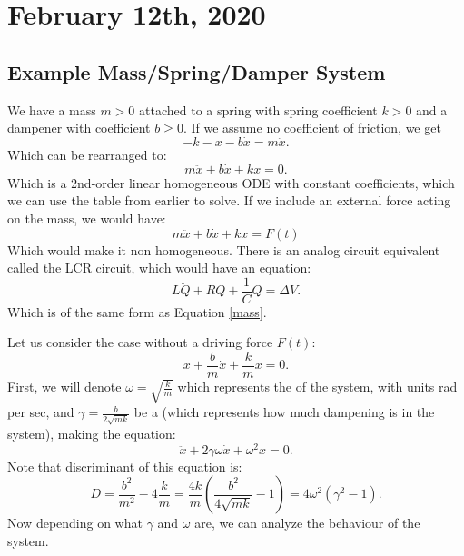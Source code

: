 \documentclass[../main/main.tex]{subfiles}
\begin{document}
\section{February 12th, 2020}
\subsection{Example Mass/Spring/Damper System}
We have a mass $m>0$ attached to a spring with spring coefficient $k>0$ and a dampener with coefficient $b\ge 0$. If we assume no coefficient of friction, we get \[
	-k-x-b\dot{x} = m\ddot{x}
.\] Which can be rearranged to: \[
m\ddot{x} + b\dot{x}+kx=0
.\] Which is a 2nd-order linear homogeneous ODE with constant coefficients, which we can use the table from earlier to solve. If we include an external force acting on the mass, we would have:
\begin{equation} \label{mass}
m\ddot{x}+b\dot{x}+kx=F(t) 
\end{equation}
Which would make it non homogeneous. There is an analog circuit equivalent called the LCR circuit, which would have an equation: \[
L\ddot{Q}+R\dot{Q}+\frac{1}{C}Q=\Delta V
.\] Which is of the same form as Equation \ref{mass}.

Let us consider the case without a driving force $F(t)$:  \[
	\ddot{x}+\frac{b}{m}\dot{x}+\frac{k}{m}x=0
	.\]First, we will denote $\omega=\sqrt{\frac{k}{m}} $ which represents the  of the system, with units rad per sec, and $\gamma=\frac{b}{2\sqrt{m k }}$ be a  (which represents how much dampening is in the system), making the equation: \[ 
	\ddot{x}+2\gamma\omega\dot{x}+\omega^2x=0
.\] Note that discriminant of this equation is: \[
D= \frac{b^2}{m^2}  -4 \frac{k}{m} = \frac{4k}{m}\left( \frac{b^2}{4\sqrt{m k} }-1 \right) = 4\omega^2(\gamma^2-1) 
.\] Now depending on what $\gamma$ and  $\omega$ are, we can analyze the behaviour of the system.
\end{document}
